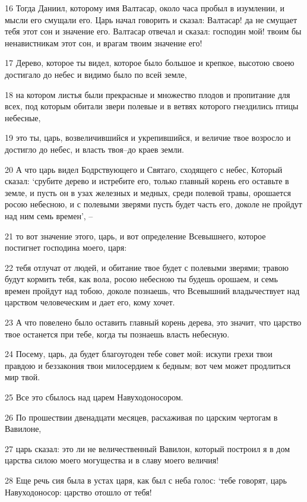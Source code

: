\par 16 Тогда Даниил, которому имя Валтасар, около часа пробыл в изумлении, и мысли его смущали его. Царь начал говорить и сказал: Валтасар! да не смущает тебя этот сон и значение его. Валтасар отвечал и сказал: господин мой! твоим бы ненавистникам этот сон, и врагам твоим значение его!
\par 17 Дерево, которое ты видел, которое было большое и крепкое, высотою своею достигало до небес и видимо было по всей земле,
\par 18 на котором листья были прекрасные и множество плодов и пропитание для всех, под которым обитали звери полевые и в ветвях которого гнездились птицы небесные,
\par 19 это ты, царь, возвеличившийся и укрепившийся, и величие твое возросло и достигло до небес, и власть твоя--до краев земли.
\par 20 А что царь видел Бодрствующего и Святаго, сходящего с небес, Который сказал: `срубите дерево и истребите его, только главный корень его оставьте в земле, и пусть он в узах железных и медных, среди полевой травы, орошается росою небесною, и с полевыми зверями пусть будет часть его, доколе не пройдут над ним семь времен', --
\par 21 то вот значение этого, царь, и вот определение Всевышнего, которое постигнет господина моего, царя:
\par 22 тебя отлучат от людей, и обитание твое будет с полевыми зверями; травою будут кормить тебя, как вола, росою небесною ты будешь орошаем, и семь времен пройдут над тобою, доколе познаешь, что Всевышний владычествует над царством человеческим и дает его, кому хочет.
\par 23 А что повелено было оставить главный корень дерева, это значит, что царство твое останется при тебе, когда ты познаешь власть небесную.
\par 24 Посему, царь, да будет благоугоден тебе совет мой: искупи грехи твои правдою и беззакония твои милосердием к бедным; вот чем может продлиться мир твой.
\par 25 Все это сбылось над царем Навуходоносором.
\par 26 По прошествии двенадцати месяцев, расхаживая по царским чертогам в Вавилоне,
\par 27 царь сказал: это ли не величественный Вавилон, который построил я в дом царства силою моего могущества и в славу моего величия!
\par 28 Еще речь сия была в устах царя, как был с неба голос: `тебе говорят, царь Навуходоносор: царство отошло от тебя!
